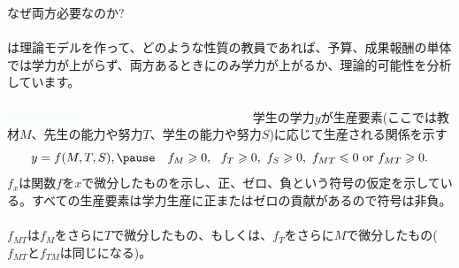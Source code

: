 \begin{frame}[t]{}
なぜ両方必要なのか?\\~\\
\citet{Mbiti2019}は理論モデルを作って、どのような性質の教員であれば、予算、成果報酬の単体では学力が上がらず、両方あるときにのみ学力が上がるか、理論的可能性を分析しています。
\\~\\
\pause
\textcolor{azure}{教育生産関数education production function:} 学生の学力$y$が生産要素(ここでは教材$M$、先生の能力や努力$T$、学生の能力や努力$S$)に応じて生産される関係を示す
\[
y=f(M, T, S), \pause\quad f_{M}\geqslant0, \ \ f_{T}\geqslant0, \ f_{S}\geqslant0, \ f_{MT}\leqslant 0 \mbox{ or }f_{MT}\geqslant0.
\]
$f_{x}$は関数$f$を$x$で微分したものを示し、正、ゼロ、負という符号の仮定を示している。すべての生産要素は学力生産に正またはゼロの貢献があるので符号は非負。\\~\\
\pause
$f_{MT}$は$f_{M}$をさらに$T$で微分したもの、もしくは、$f_{T}$をさらに$M$で微分したもの($f_{MT}$と$f_{TM}$は同じになる)。
\end{frame}

